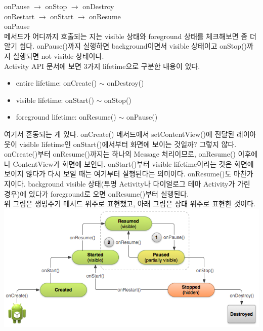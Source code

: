 onPause $\rightarrow$ onStop $\rightarrow$ onDestroy\\

onRestart $\rightarrow$ onStart $\rightarrow$ onResume\\

onPause
\\

메서드가 어디까지 호출되는 지는 visible 상태와 foreground 상태를 체크해보면 좀 더 알기 쉽다.
onPause()까지 실행하면 background이면서 visible 상태이고 onStop()까지 실행되면 not visible 상태이다.\\

Activity API 문서에 보면 3가지 lifetime으로 구분한 내용이 있다.
\begin{itemize}
\item entire lifetime: onCreate() $\sim$
 onDestroy()
\item visible lifetime: onStart() $\sim$
 onStop()
\item foreground lifetime: onResume() $\sim$
 onPause()
\end{itemize}
여기서 혼동되는 게 있다. onCreate() 메서드에서 setContentView()에 전달된 레이아웃이 visible lifetime인 onStart()에서부터 화면에 보이는 것일까? 그렇지 않다. 
onCreate()부터 onResume()까지는 하나의 Message 처리이므로, onResume() 이후에나 ContentView가 화면에 보인다.
onStart()부터 visible lifetime이라는 것은 화면에 보이지 않다가 다시 보일 때는 여기부터 실행된다는 의미이다.
onResume()도 마찬가지이다. background visible 상태(투명 Activity나 다이얼로그 테마 Activity가 가린 경우)에 있다가 foreground로 오면 onResume()부터 실행된다.\\

위 그림은 생명주기 메서드 위주로 표현했고, 아래 그림은 상태 위주로 표현한 것이다.\\
\includegraphics[scale=0.5]{basic-lifecycle-paused}

